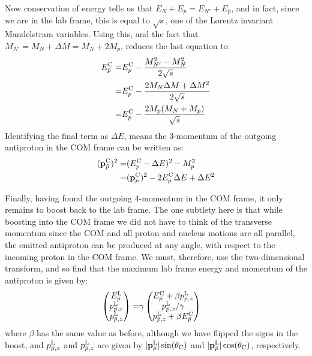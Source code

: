 Now conservation of energy tells us that $E_N+E_p=E_{N'}+E_{\bar{p}}$, and in fact, since we are in the lab frame, this is equal to $\sqrt{s}$, one of the Lorentz invariant Mandelstram variables.
Using this, and the fact that $M_{N'}=M_N+\Delta{}M=M_N+2M_p$, reduces the last equation to:
\begin{align}
E^{\textrm{C}}_{\bar{p}}=&
E^{\textrm{C}}_{p}-
\frac{M_{N'}^2-M_N^2}{2\sqrt{s}}\\
=& E^{\textrm{C}}_{p}-
\frac{2M_{N}\Delta{}M+\Delta{}M^2}{2\sqrt{s}}\\
=& E^{\textrm{C}}_{p}-
\frac{2M_{p}(M_N+M_p)}{\sqrt{s}}
\end{align}
Identifying the final term as $\Delta{}E$, means the 3-momentum of the outgoing antiproton in the \ac{COM} frame can be written as:
\begin{align}
(\mathbf{p}^{\textrm{C}}_{\bar{p}})^2 
=& (E_p^{\textrm{C}}-\Delta{}E)^2-M_p^2\\
=& (\mathbf{p}^{\textrm{C}}_{p})^2-2E_p^{\textrm{C}}\Delta{}E+\Delta{}E^2
\end{align}

Finally, having found the outgoing 4-momentum in the \ac{COM} frame, it only remains to boost back to the lab frame.
The one subtlety here is that while boosting into the \ac{COM} frame we did not have to think of the transverse momentum since the \ac{COM} and all proton and nucleus motions are all parallel,
the emitted antiproton can be produced at any angle, with respect to the incoming proton in the \ac{COM} frame.
We must, therefore, use the two-dimensional transform, and so find that the maximum lab frame energy and momentum of the antiproton  is given by:
\begin{align}
\begin{pmatrix}
E^{\textrm{L}}_{\bar{p}}\\
p^{\textrm{L}}_{\bar{p},x}\\
p^{\textrm{L}}_{\bar{p},z}
\end{pmatrix}
=&\gamma
\begin{pmatrix}
E^{\textrm{C}}_{\bar{p}}+\beta{}p^{\textrm{L}}_{\bar{p},z}\\
p^{\textrm{L}}_{\bar{p},x}/\gamma{}\\
p^{\textrm{L}}_{\bar{p},z}+\beta{}E^{\textrm{C}}_{\bar{p}}
\end{pmatrix}
\end{align}
where $\beta$ has the same value as before, although we have flipped the signs in the boost, and $p^{\textrm{L}}_{\bar{p},x}$  and $p^{\textrm{L}}_{\bar{p},z}$  are given by $|\mathbf{p}^{\textrm{L}}_{\bar{p}}|\sin(\theta_{\textrm{C}})$  and $|\mathbf{p}^{\textrm{L}}_{\bar{p}}|\cos(\theta_{\textrm{C}})$, respectively.

